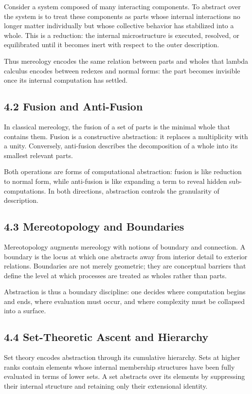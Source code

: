 \documentclass[11pt,letterpaper]{article}
\begin{document}
Consider a system composed of many interacting components. To abstract over the system is to treat these components as parts whose internal interactions no longer matter individually but whose collective behavior has stabilized into a whole. This is a reduction: the internal microstructure is executed, resolved, or equilibrated until it becomes inert with respect to the outer description.

Thus mereology encodes the same relation between parts and wholes that lambda calculus encodes between redexes and normal forms: the part becomes invisible once its internal computation has settled.

\subsection{4.2 Fusion and Anti-Fusion}

In classical mereology, the fusion of a set of parts is the minimal whole that contains them. Fusion is a constructive abstraction: it replaces a multiplicity with a unity. Conversely, anti-fusion describes the decomposition of a whole into its smallest relevant parts.

Both operations are forms of computational abstraction: fusion is like reduction to normal form, while anti-fusion is like expanding a term to reveal hidden sub-computations. In both directions, abstraction controls the granularity of description.

\subsection{4.3 Mereotopology and Boundaries}

Mereotopology augments mereology with notions of boundary and connection. A boundary is the locus at which one abstracts away from interior detail to exterior relations. Boundaries are not merely geometric; they are conceptual barriers that define the level at which processes are treated as wholes rather than parts.

Abstraction is thus a boundary discipline: one decides where computation begins and ends, where evaluation must occur, and where complexity must be collapsed into a surface.

\subsection{4.4 Set-Theoretic Ascent and Hierarchy}

Set theory encodes abstraction through its cumulative hierarchy. Sets at higher ranks contain elements whose internal membership structures have been fully evaluated in terms of lower sets. A set abstracts over its elements by suppressing their internal structure and retaining only their extensional identity.
\end{document}
